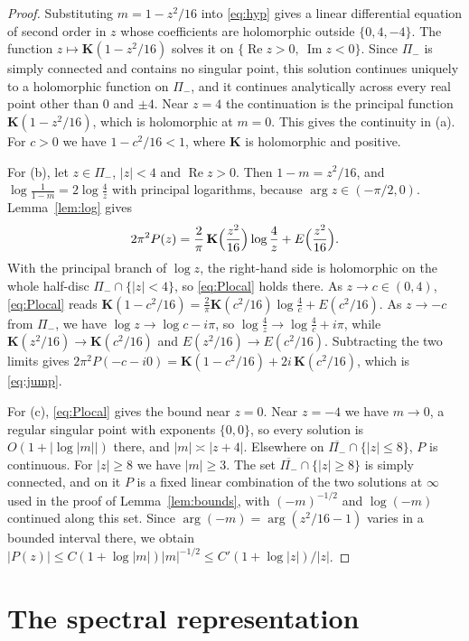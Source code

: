 \documentclass[11pt]{amsart}
\numberwithin{equation}{section}
\theoremstyle{definition}
\theoremstyle{remark}
\newcommand{\Pim}{\Pi_{-}}
\DeclareMathOperator{\re}{Re}
\DeclareMathOperator{\im}{Im}
\newcommand{\Kc}{\mathbf{K}}
\begin{document}
\begin{proof}
Substituting $m=1-z^2/16$ into \eqref{eq:hyp} gives a linear differential
equation of second order in $z$ whose coefficients are holomorphic outside
$\{0,4,-4\}$. The function $z\mapsto\Kc(1-z^2/16)$ solves it on
$\{\re z>0,\ \im z<0\}$. Since $\Pim$ is simply connected and contains no
singular point, this solution continues uniquely to a holomorphic function on
$\Pim$, and it continues analytically across every real point other than $0$
and $\pm4$. Near $z=4$ the continuation is the principal function
$\Kc(1-z^2/16)$, which is holomorphic at $m=0$. This gives the continuity in
(a). For $c>0$ we have $1-c^2/16<1$, where $\Kc$ is holomorphic and positive.

For (b), let $z\in\Pim$, $|z|<4$ and $\re z>0$. Then $1-m=z^2/16$, and
$\log\frac1{1-m}=2\log\frac4z$ with principal logarithms, because
$\arg z\in(-\pi/2,0)$. Lemma~\ref{lem:log} gives
\begin{equation}\label{eq:Plocal}
2\pi^2P(z)=\frac2\pi\,\Kc\Bigl(\frac{z^2}{16}\Bigr)\log\frac4z+E\Bigl(\frac{z^2}{16}\Bigr).
\end{equation}
With the principal branch of $\log z$, the right-hand side is holomorphic on
the whole half-disc $\Pim\cap\{|z|<4\}$, so \eqref{eq:Plocal} holds there. As
$z\to c\in(0,4)$, \eqref{eq:Plocal} reads
$\Kc(1-c^2/16)=\frac2\pi\Kc(c^2/16)\log\frac4c+E(c^2/16)$. As $z\to-c$ from
$\Pim$, we have $\log z\to\log c-i\pi$, so $\log\frac4z\to\log\frac4c+i\pi$,
while $\Kc(z^2/16)\to\Kc(c^2/16)$ and $E(z^2/16)\to E(c^2/16)$. Subtracting the
two limits gives
$2\pi^2P(-c-i0)=\Kc(1-c^2/16)+2i\,\Kc(c^2/16)$, which is \eqref{eq:jump}.

For (c), \eqref{eq:Plocal} gives the bound near $z=0$. Near $z=-4$ we have
$m\to0$, a regular singular point with exponents $\{0,0\}$, so every
solution is $O(1+|\log|m||)$ there, and $|m|\asymp|z+4|$. Elsewhere on
$\overline{\Pim}\cap\{|z|\le8\}$, $P$ is continuous. For $|z|\ge8$ we have
$|m|\ge3$. The set $\overline{\Pim}\cap\{|z|\ge8\}$ is simply connected, and on
it $P$ is a fixed linear combination of the two solutions at $\infty$ used in
the proof of Lemma~\ref{lem:bounds}, with $(-m)^{-1/2}$ and $\log(-m)$
continued along this set. Since $\arg(-m)=\arg(z^2/16-1)$ varies in a bounded
interval there, we obtain $|P(z)|\le C(1+\log|m|)|m|^{-1/2}\le
C'(1+\log|z|)/|z|$.
\end{proof}

\section{The spectral representation}\label{sec:spectral}
\end{document}
